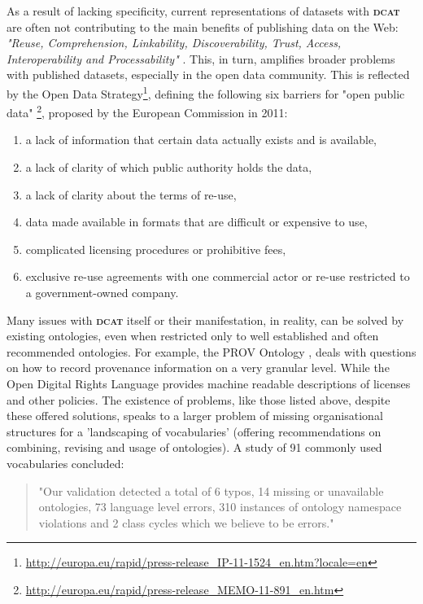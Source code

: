 \documentclass[a4paper,english,twoside,BCOR1.5cm,headsepline,DIV12,appendixprefix,final,12pt]{scrbook}
\newcommand{\dcat}{{\scshape\bfseries dcat}\xspace}
\newcommand\footnoteurl[1]{\footnote{\scriptsize\url{#1}}}
\begin{document}
As a result of lacking specificity, current representations of datasets with \dcat are often not contributing to the main benefits of publishing data on the Web: \textit{"Reuse, Comprehension, Linkability, Discoverability, Trust, Access, Interoperability and Processability"} \cite{dwbpW3C2016}. This, in turn, amplifies broader problems with published datasets, especially in the open data community. This is reflected by the Open Data Strategy\footnoteurl{http://europa.eu/rapid/press-release_IP-11-1524_en.htm?locale=en}, defining the following six barriers for "open public data" \footnoteurl{http://europa.eu/rapid/press-release_MEMO-11-891_en.htm}, proposed by the European Commission in 2011:

\begin{enumerate}
\item a lack of information that certain data actually exists and is available,
\item a lack of clarity of which public authority holds the data,
\item a lack of clarity about the terms of re-use,
\item data made available in formats that are difficult or expensive to use,
\item complicated licensing procedures or prohibitive fees,
\item exclusive re-use agreements with one commercial actor or re-use restricted to a government-owned company.
\end{enumerate}

Many issues with \dcat itself or their manifestation, in reality, can be solved by existing ontologies, even when restricted only to well established and often recommended ontologies. For example, the PROV Ontology \cite{prov}, deals with questions on how to record provenance information on a very granular level. While the Open Digital Rights Language \cite{odrl} provides machine readable descriptions of licenses and other policies. The existence of problems, like those listed above, despite these offered solutions, speaks to a larger problem of missing organisational structures for a 'landscaping of vocabularies' (offering recommendations on combining, revising and usage of ontologies). A study of 91 commonly used vocabularies concluded:

\begin{quote}
"Our validation detected a total of 6 typos, 14
missing or unavailable ontologies, 73 language level
errors, 310 instances of ontology namespace violations
and 2 class cycles which we believe to be errors." \cite{feeney2015linked}
\end{quote}
\end{document}
